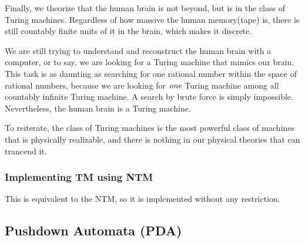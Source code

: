 \documentclass[12pt]{article}  %
\begin{document}
Finally, we theorize that the human brain is not beyond, but is in the class of Turing machines. Regardless of how massive the human memory(tape) is, there is still countably finite units of it in the brain, which makes it discrete. 

We are still trying to understand and reconstruct the human brain with a computer, or to say, we are looking for a Turing machine that mimics our brain. This task is as daunting as searching for one rational number within the space of rational numbers, because we are looking for $\emph{one}$ Turing machine among all countably infinite Turing machine. A search by brute force is simply impossible. Nevertheless, the human brain is a Turing machine.

To reiterate, the class of Turing machines is the most powerful class of machines that is physically realizable, and there is nothing in our physical theories that can trancend it.




\subsubsection{Implementing TM using NTM}
This is equivalent to the NTM, so it is implemented without any restriction.





\subsection{Pushdown Automata (PDA)}
\end{document}
